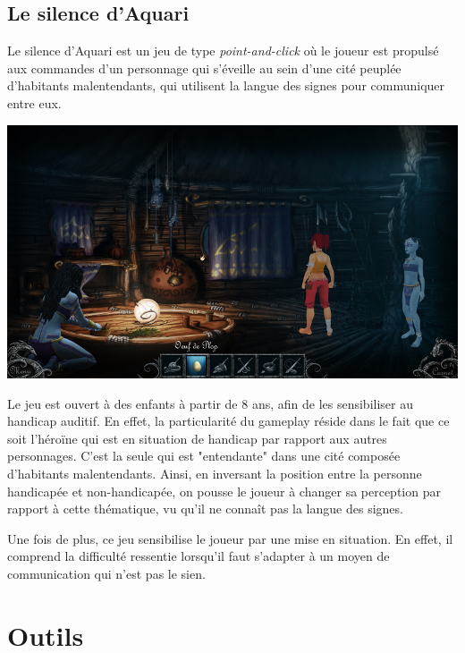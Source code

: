 \documentclass[a4paper,11pt]{article}
\begin{document}
\subsection{Le silence d'Aquari}

Le silence d'Aquari est un jeu de type \textit{point-and-click} où le joueur est propulsé aux commandes d’un personnage qui s’éveille au sein d’une cité peuplée d’habitants malentendants, qui utilisent la langue des signes pour communiquer entre eux.

\begin{center}
\includegraphics[scale=0.35]{./fig/jeu3.png}
\end{center}

Le jeu est ouvert à des enfants à partir de 8 ans, afin de les sensibiliser au handicap auditif. En effet, la particularité du gameplay réside dans le fait que ce soit l’héroïne qui est en situation de handicap par rapport aux autres personnages. C’est la seule qui est "entendante" dans une cité composée d’habitants malentendants. Ainsi, en inversant la position entre la personne handicapée et non-handicapée, on pousse le joueur à changer sa perception par rapport à cette thématique, vu qu’il ne connaît pas la langue des signes.

Une fois de plus, ce jeu sensibilise le joueur par une mise en situation. En effet, il comprend la difficulté ressentie lorsqu’il faut s’adapter à un moyen de communication qui n’est pas le sien.

\section{Outils}
\end{document}
